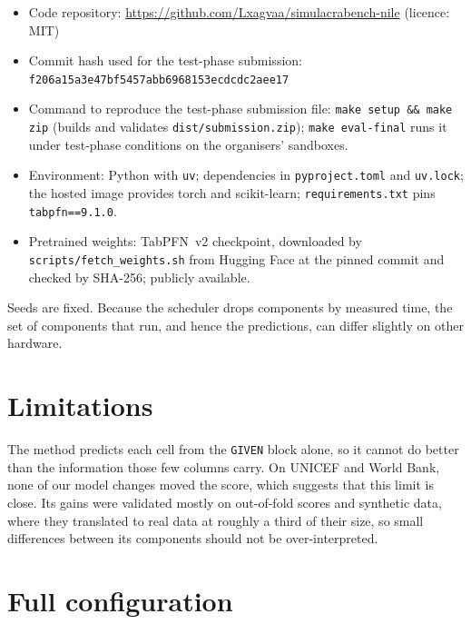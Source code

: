 \documentclass{article}
\begin{document}
\begin{itemize}[leftmargin=*]
  \item Code repository: \url{https://github.com/Lxagvaa/simulacrabench-nile} (licence: MIT)
  \item Commit hash used for the test-phase submission:\\ \texttt{f206a15a3e47bf5457abb6968153ecdcdc2aee17}
  \item Command to reproduce the test-phase submission file: \texttt{make setup \&\& make zip}
        (builds and validates \texttt{dist/submission.zip}); \texttt{make eval-final} runs it under
        test-phase conditions on the organisers' sandboxes.
  \item Environment: Python with \texttt{uv}; dependencies in \texttt{pyproject.toml} and
        \texttt{uv.lock}; the hosted image provides torch and scikit-learn; \texttt{requirements.txt}
        pins \texttt{tabpfn==9.1.0}.
  \item Pretrained weights: TabPFN~v2 checkpoint, downloaded by \texttt{scripts/fetch\_weights.sh}
        from Hugging Face at the pinned commit and checked by SHA-256; publicly available.
\end{itemize}
Seeds are fixed. Because the scheduler drops components by measured time, the set of components
that run, and hence the predictions, can differ slightly on other hardware.

\section{Limitations}
\label{sec:limitations}

The method predicts each cell from the \texttt{GIVEN} block alone, so it cannot do better than the
information those few columns carry. On UNICEF and World Bank, none of our model changes moved the
score, which suggests that this limit is close. Its gains were validated mostly on out-of-fold scores and synthetic data, where they
translated to real data at roughly a third of their size, so small differences between its
components should not be over-interpreted.




\clearpage
\appendix

\section{Full configuration}
\label{app:config}
\end{document}
